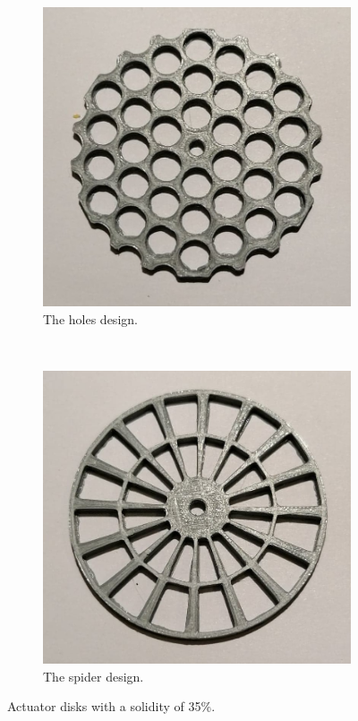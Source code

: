 \begin{figure} [h!]
    \centering
    \begin{subfigure}[b]{0.45\linewidth}
        \includegraphics[width=\textwidth]{0_Images/holes35.jpg}
        \caption{The \gls{holes} design.}
        \label{Fig:holes35}
    \end{subfigure}
    ~
    \begin{subfigure}[b]{0.45\linewidth}
        \includegraphics[width=\textwidth]{0_Images/spider35.jpg}
        \caption{The \gls{spider} design.}
        \label{Fig:spider35}
    \end{subfigure}
    \caption{Actuator disks with a solidity of 35\%.}
    \label{Fig:35Sol}
\end{figure}

